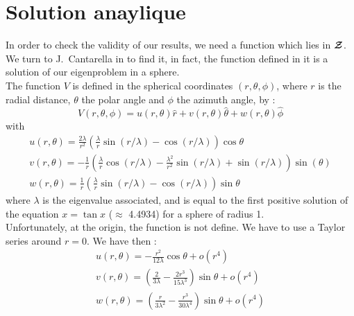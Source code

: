 \section{Solution anaylique}
In order to check the validity of our results, we need a function which lies in
${\bm{\mathcal{Z}}}$. We turn to J.~Cantarella in \cite{Cantarella2000} to find it, in fact,
the function defined in it is a solution of our eigenproblem in a sphere.\\
The
function $V$ is defined in the spherical coordinates $(r,\theta,\phi)$, where
$r$ is the radial distance, $\theta$ the polar angle and $\phi$ the azimuth 
angle, by :
\[ V(r,\theta,\phi) = u(r,\theta)\hat{r} + v(r,\theta)\hat{\theta} + w(r,\theta)\hat{\phi} \]
with
\begin{gather*}
u(r,\theta) =
\frac{2\lambda}{r^2}\left(\frac{\lambda}{r}\sin(r/\lambda)-\cos(r/\lambda)\right)\cos\theta\\
v(r,\theta) = -\frac{1}{r}\left(\frac{\lambda}{r}\cos(r/\lambda) -
  \frac{\lambda^2}{r^2}\sin(r/\lambda) + \sin(r/\lambda)\right)\sin(\theta)\\
w(r,\theta) = \frac{1}{r}\left(\frac{\lambda}{r}\sin(r/\lambda) - \cos(r/\lambda)\right)\sin\theta
\end{gather*}
where $\lambda$ is the eigenvalue associated, and is equal to the first positive
solution of the equation $x=\tan x$ ($\approx$ 4.4934) for a sphere of radius 1.\\

Unfortunately, at the origin, the function is not define. We have to use a Taylor series around $r=0$. We have then :
\begin{gather*}
u(r,\theta) = -\frac{r^2}{12\lambda}\cos\theta +o(r^4)\\
v(r,\theta) = \left(\frac{2}{3\lambda}-\frac{2r^3}{15\lambda^3}\right)\sin\theta + o(r^4)\\
w(r,\theta) =
\left(\frac{r}{3\lambda^2}-\frac{r^3}{30\lambda^4}\right)\sin\theta + o(r^4)
\end{gather*} 

